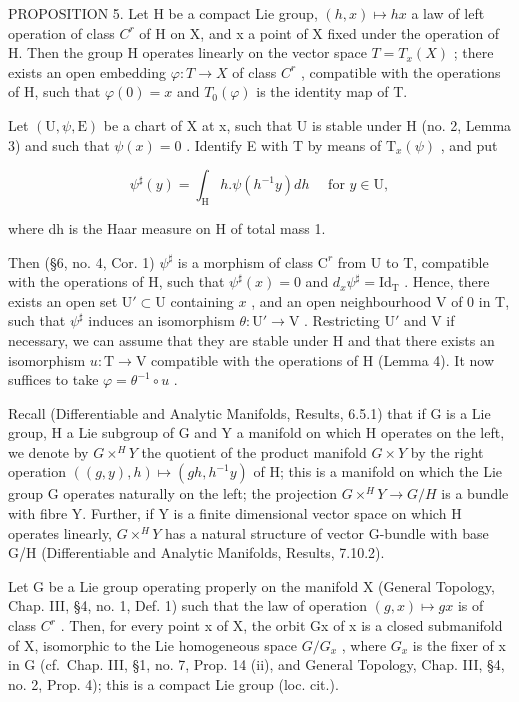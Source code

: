 PROPOSITION 5. Let H be a compact Lie group, \((h,x)\mapsto hx\) a law of left operation of class \(C^{r}\) of H on X, and x a point of X fixed under the operation of H. Then the group H operates linearly on the vector space \(T=T_{x}(X)\) ; there exists an open embedding \(\varphi:T\to X\) of class \(C^{r}\) , compatible with the operations of H, such that \(\varphi(0)=x\) and \(T_{0}(\varphi)\) is the identity map of T.

Let \((\mathrm{U},\psi,\mathrm{E})\) be a chart of X at x, such that U is stable under H (no. 2, Lemma 3) and such that \(\psi(x)=0\) . Identify E with T by means of \(\mathrm{T}_{x}(\psi)\) , and put

\[
\psi^ {\sharp} (y) = \int_ {\mathrm{H}} h. \psi (h ^ {- 1} y) d h \quad \text { for } y \in \mathrm{U},
\]

where dh is the Haar measure on H of total mass 1.

Then (§6, no. 4, Cor. 1) \(\psi^{\sharp}\) is a morphism of class \(\mathrm{C}^r\) from U to T, compatible with the operations of H, such that \(\psi^{\sharp}(x) = 0\) and \(d_x\psi^\sharp = \mathrm{Id}_\mathrm{T}\) . Hence, there exists an open set \(\mathrm{U}' \subset \mathrm{U}\) containing \(x\) , and an open neighbourhood V of 0 in T, such that \(\psi^{\sharp}\) induces an isomorphism \(\theta: \mathrm{U}' \to \mathrm{V}\) . Restricting \(\mathrm{U}'\) and V if necessary, we can assume that they are stable under H and that there exists an isomorphism \(u: \mathrm{T} \to \mathrm{V}\) compatible with the operations of H (Lemma 4). It now suffices to take \(\varphi = \theta^{-1} \circ u\) .

Recall (Differentiable and Analytic Manifolds, Results, 6.5.1) that if G is a Lie group, H a Lie subgroup of G and Y a manifold on which H operates on the left, we denote by \(G \times^{H}Y\) the quotient of the product manifold \(G \times Y\) by the right operation \(((g,y),h) \mapsto (gh,h^{-1}y)\) of H; this is a manifold on which the Lie group G operates naturally on the left; the projection \(G \times^{H}Y \to G/H\) is a bundle with fibre Y. Further, if Y is a finite dimensional vector space on which H operates linearly, \(G \times^{H}Y\) has a natural structure of vector G-bundle with base G/H (Differentiable and Analytic Manifolds, Results, 7.10.2).

Let G be a Lie group operating properly on the manifold X (General Topology, Chap. III, §4, no. 1, Def. 1) such that the law of operation \((g, x) \mapsto gx\) is of class \(C^{r}\) . Then, for every point x of X, the orbit Gx of x is a closed submanifold of X, isomorphic to the Lie homogeneous space \(G/G_{x}\) , where \(G_{x}\) is the fixer of x in G (cf.~Chap. III, §1, no. 7, Prop. 14 (ii), and General Topology, Chap. III, §4, no. 2, Prop. 4); this is a compact Lie group (loc. cit.).

